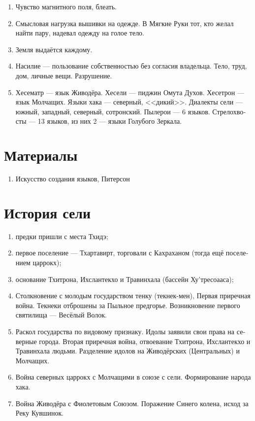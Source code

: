 \documentclass[a4paper,12pt,fleqn]{book}\usepackage{polyglossia}\setdefaultlanguage[babelshorthands=true]{russian}\setotherlanguage{english}\defaultfontfeatures{Ligatures=TeX,Mapping=tex-text}\usepackage{xcolor}\newcommand{\ml}[3]{#2}
\begin{document}
{\begin{enumerate}
\item Чувство магнитного поля, блеать.

\item Смысловая нагрузка вышивки на одежде.
В Мягкие Руки тот, кто желал найти пару, надевал одежду на голое тело.

\item Земля выдаётся каждому.

\item Насилие --- пользование собственностью без согласия владельца.
Тело, труд, дом, личные вещи.
Разрушение.

\item Хесематр --- язык Живодёра.
Хесели --- пиджин Омута Духов.
Хесетрон --- язык Молчащих.
Языки хака --- северный, <<дикий>>.
Диалекты сели --- южный, западный, северный, сотронский.
Пылерои --- 6 языков. Стрелохвосты --- 13 языков, из них 2 --- языки Голубого Зеркала.
\end{enumerate}

\section{Материалы}

\begin{enumerate}

\item Искусство создания языков, Питерсон

\end{enumerate}

\section{История сели}

\begin{enumerate}
\item предки пришли с места Тхидэ;
\item первое поселение --- Тхартавирт, торговали с Кахраханом (тогда ещё поселением царрокх);
\item основание Тхитрона, Ихслантекхо и Травинхала (бассейн Ху'тресоааса);
\item Столкновение с молодым государством тенку (текнек-мен), Первая приречная война.
Текнеки отброшены за Пыльное предгорье.
Возникновение первого святилища --- Весёлый Волок.
\item Раскол государства по видовому признаку.
Идолы заявили свои права на северные города.
Вторая приречная война, отвоевание Тхитрона, Ихслантекхо и Травинхала людьми.
Разделение идолов на Живодёрских (Центральных) и Молчащих.
\item Война северных царрокх с Молчащими в союзе с сели.
Формирование народа хака.
\item Война Живодёра с Фиолетовым Союзом.
Поражение Синего колена, исход за Реку Кувшинок.
\end{enumerate}

}
\end{document}
